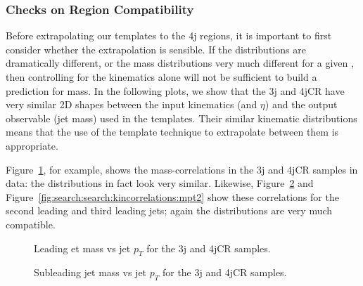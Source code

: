 \subsubsection{Checks on Region Compatibility}

Before extrapolating our templates to the 4j regions, it is important to first consider whether the extrapolation is sensible. If the \pt distributions are dramatically different, or the mass distributions very much different for a given \pt, then controlling for the kinematics alone will not be sufficient to build a prediction for mass. In the following plots, we show that the 3j and 4jCR have very similar 2D shapes between the input kinematics (\pt and $\eta$) and the output observable (jet mass) used in the templates. Their similar kinematic distributions means that the use of the template technique to extrapolate between them is appropriate.


Figure~\ref{fig:search:search:kincorrelations:mpt0}, for example, shows the mass-\pt correlations in the 3j and 4jCR samples in data: the distributions in fact look very similar. Likewise, Figure~\ref{fig:search:search:kincorrelations:mpt1} and Figure~\ref{fig:search:search:kincorrelations:mpt2} show these correlations for the second leading and third leading jets; again the distributions are very much compatible.

\begin{figure}[!ht]
  \centering
  

    
  \caption{Leading et mass vs jet $p_T$ for the 3j and 4jCR samples.}
           
  \label{fig:search:search:kincorrelations:mpt0}
\end{figure}

\begin{figure}[!ht]
  \centering
  

    
  \caption{Subleading jet mass vs jet $p_T$ for the 3j and 4jCR samples.}
           
  \label{fig:search:search:kincorrelations:mpt1}
\end{figure}


